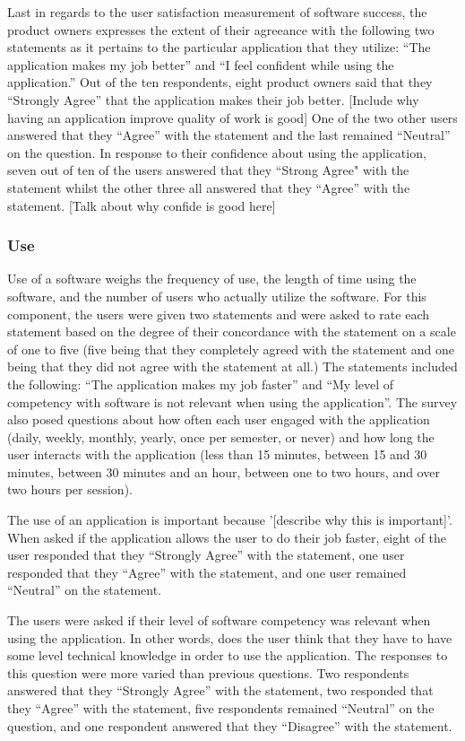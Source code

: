 Last in regards to the user satisfaction measurement of software success, the product owners expresses the extent of their agreeance with the following two statements as it pertains to the particular application that they utilize: ``The application makes my job better'' and ``I feel confident while using the application.'' Out of the ten respondents, eight product owners said that they ``Strongly Agree'' that the application makes their job better. [Include why having an application improve quality of work is good] One of the two other users answered that they ``Agree'' with the statement and the last remained ``Neutral'' on the question. In response to their confidence about using the application, seven out of ten of the users answered that they ``Strong Agree" with the statement whilst the other three all answered that they ``Agree'' with the statement. [Talk about why confide is good here]

 \subsubsection{Use}
Use of a software weighs the frequency of use, the length of time using the software, and the number of users who actually utilize the software. For this component, the users were given two statements and were asked to rate each statement based on the degree of  their concordance with the statement on a scale of one to five (five being that they completely agreed with the statement and one being that they did not agree with the statement at all.) The statements included the following: ``The application makes my job faster'' and ``My level of competency with software is not relevant when using the application''. The survey also posed questions about how often each user engaged with the application (daily, weekly, monthly, yearly, once per semester, or never)  and how long the user interacts with the application (less than 15 minutes, between 15 and 30 minutes, between 30 minutes and an hour, between one to two hours, and over two hours per session).

The use of an application is important because '[describe why this is important]'. When asked if the application allows the user to do their job faster, eight of the user responded that they ``Strongly Agree'' with the statement, one user responded that they ``Agree'' with the statement, and one user remained ``Neutral'' on the statement.

The users were asked if their level of software competency was relevant when using the application. In other words, does the user think that they have to have some level technical knowledge in order to use the application. The responses to this question were more varied than previous questions. Two respondents answered that they ``Strongly Agree'' with the statement,  two responded that they ``Agree'' with the statement, five respondents remained ``Neutral'' on the question, and one respondent answered that they ``Disagree'' with the statement.

